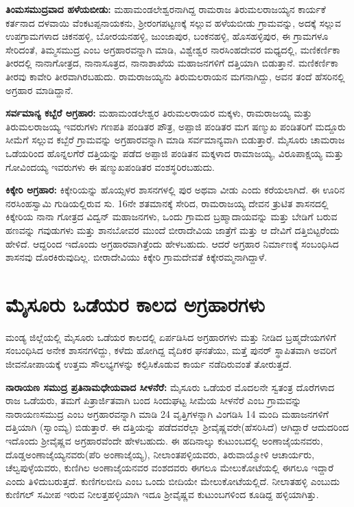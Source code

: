 \textbf{ತಿಂಮಸಮುದ್ರವಾದ ಹಳೆಯಬೀಡು: } ಮಹಾಮಂಡಲೇಶ್ವರನಾಗಿದ್ದ ರಾಮರಾಜ ತಿರುಮಲರಾಜಯ್ಯನ ಕಾರ್ಯಕೆ ಕರ್ತನಾದ ದಳವಾಯಿ ವೆಂಕಟಪ್ಪನಾಯಕನು, ಶ‍್ರೀರಂಗಪಟ್ಟಣಕ್ಕೆ ಸಲ್ಲುವ ಹಳೆಯಬೀಡು ಗ್ರಾಮವನ್ನು, ಅದಕ್ಕೆ ಸಲ್ಲುವ ಉಪಗ್ರಾಮಗಳಾದ ಚಿಕನಹಳ್ಳಿ, ಬೋರಯನಹಳ್ಳಿ, ಜುಂಜಾಪುರ, ಬಂಕನಹಳ್ಳಿ, ಹೊಸಹಳ್ಳಿಪುರ, ಈ ಗ್ರಾಮಗಳೂ ಸೇರಿದಂತೆ, ತಿಮ್ಮಸಮುದ್ರ ಎಂಬ ಅಗ್ರಹಾರವನ್ನಾಗಿ ಮಾಡಿ, ವಿಶ್ವೇಶ್ವರ ನಾರಸಿಂಹದೇವರ ಮಧ್ಯದಲ್ಲಿ, ಮಣಿಕರ್ಣಿಕಾ ತೀರದಲ್ಲಿ ನಾನಾಗೋತ್ರದ, ನಾನಾಸೂತ್ರದ, ನಾನಾಶಾಖೆಯ ಮಹಾಜನಗಳಿಗೆ ದತ್ತಿಯಾಗಿ ಬಿಡುತ್ತಾನೆ. ಮಣಿಕರ್ಣಿಕಾ ತೀರವು ಕಾವೇರಿ ತೀರವಾಗಿರಬಹುದು. ರಾಮರಾಜಯ್ಯನು ತಿರುಮಲರಾಯನ ಮಗನಾಗಿದ್ದು, ಅವನ ತಂದೆ ಹೆಸರಿನಲ್ಲಿ ಅಗ್ರಹಾರ ಮಾಡಿದ್ದಾನೆ.

\textbf{ಸರ್ವಮಾನ್ಯ ಕಬ್ಬೆರೆ ಅಗ್ರಹಾರ:} ಮಹಾಮಂಡಲೇಶ್ವರ ತಿರುಮಲರಾಯರ ಮಕ್ಕಳು, ರಾಮರಾಜಯ್ಯ ಮತ್ತು ತಿರುಮಲರಾಜಯ್ಯ ಇವರುಗಳು ಗಣಪತಿ ಪಂಡಿತರ ಪೌತ್ರ, ಅಪ್ಪಾಜಿ ಪಂಡಿತರ ಮಗ ಷಣ್ಮುಖ ಪಂಡಿತರಿಗೆ ಮದ್ದೂರು ಸೀಮೆಗೆ ಸಲ್ಲುವ ಕಬ್ಬೆರೆ ಗ್ರಾಮವನ್ನು ಅಗ್ರಹಾರವನ್ನಾಗಿ ಮಾಡಿ ಸರ್ವಮಾನ್ಯವಾಗಿ ಬಿಡುತ್ತಾರೆ. ಮೈಸೂರು ಚಾಮರಾಜ ಒಡೆಯರಿಂದ ಹೊನ್ನಲಗೆರೆ ದತ್ತಿಯನ್ನು ಪಡೆದ ಅಪ್ಪಾಜಿ ಪಂಡಿತನ ಮಕ್ಕಳಾದ ರಾಮಾಜಯ್ಯ, ವಿರೂಪಾಕ್ಷಯ್ಯ ಮತ್ತು ಗೋವಿಂದಯ್ಯ ಇವರುಗಳು ಈ ಷಣ್ಮುಖಪಂಡಿತರ ವಂಶಸ್ಥರಿರಬಹುದು.

\textbf{ಕಿಕ್ಕೇರಿ ಅಗ್ರಹಾರ:} ಕಿಕ್ಕೇರಿಯನ್ನು ಹೊಯ್ಸಳರ ಶಾಸನಗಳಲ್ಲಿ ಪುರ ಅಥವಾ ವೀಡು ಎಂದು ಕರೆಯಲಾಗಿದೆ. ಈ ಊರಿನ ನರಸಿಂಹಸ್ವಾಮಿ ಗುಡಿಯಲ್ಲಿರುವ ಸು. 16ನೇ ಶತಮಾನಕ್ಕೆ ಸೇರಿದ, ರಾಮರಾಜಯ್ಯ ದೇವನ ತ್ರುಟಿತ ಶಾಸನದಲ್ಲಿ ಕಿಕ್ಕೇರಿಯ ನಾನಾ ಗೋತ್ರದ ವಿದ್ವನ್​ ಮಹಾಜನಗಳು, ಒಂದು ಗ್ರಾಮದ ಬ್ರಹ್ಮಾದಾಯವನ್ನು ಮತ್ತು ಬೇಡಿಗೆ ಬರುವ ಹಣವನ್ನು ಗವುಡುಗಳು ಮತ್ತು ಶಾನಬೋವರ ಮುಂದೆ ಬೀರಾದೇವಿಯ ಜಾತ್ರೆಗೆ ಮತ್ತು ಆ ದೇವಿಗೆ ದತ್ತಿಬಿಟ್ಟರೆಂದು ಹೇಳಿದೆ. ಆದ್ದರಿಂದ ಇದೊಂದು ಅಗ್ರಹಾರವಾಗಿತ್ತೆಂದು ಹೇಳಬಹುದು. ಆದರೆ ಅಗ್ರಹಾರ ನಿರ್ಮಾಣಕ್ಕೆ ಸಂಬಂಧಿಸಿದ ಶಾಸನವು ದೊರಕಿರುವುದಿಲ್ಲ. ಬೀರಾದೇವಿಯು ಕಿಕ್ಕೇರಿ ಗ್ರಾಮದೇವತೆ ಕಿಕ್ಕೇರಮ್ಮನಾಗಿದ್ದಾಳೆ.


\section{ಮೈಸೂರು ಒಡೆಯರ ಕಾಲದ ಅಗ್ರಹಾರಗಳು}

ಮಂಡ್ಯ ಜಿಲ್ಲೆಯಲ್ಲಿ ಮೈಸೂರು ಒಡೆಯರ ಕಾಲದಲ್ಲಿ ಏರ್ಪಡಿಸಿದ ಅಗ್ರಹಾರಗಳು ಮತ್ತು ನೀಡಿದ ಬ್ರಹ್ಮದೇಯಗಳಿಗೆ ಸಂಬಂಧಿಸಿದ ಅನೇಕ ಶಾಸನಗಳಿದ್ದು, ಕಳೆದು ಹೋಗಿದ್ದ ವೈದಿಕರ ಘನತೆಯು, ಮತ್ತೆ ಪುನರ್​ ಸ್ಥಾಪಿತವಾಗಿ ಅವರಿಗೆ ಜೀವನೋಪಾಯಕ್ಕೆ ಉತ್ತಮ ಸೌಲಭ್ಯಗಳನ್ನು ಕಲ್ಪಿಸಿಕೊಡುವ ಕಾರ್ಯ ನಡೆದಿರುವಂತೆ ತೋರುತ್ತದೆ.

\textbf{ನಾರಾಯಣ ಸಮುದ್ರ ಪ್ರತಿನಾಮಧೇಯವಾದ ಸೀಳನೆರೆ:} ಮೈಸೂರು ಒಡೆಯರ ಮೊದಲನೇ ಸ್ವತಂತ್ರ ದೊರೆಗಳಾದ ರಾಜ ಒಡೆಯರು, ತಮಗೆ ಪಿತ್ರಾರ್ಜಿತವಾಗಿ ಬಂದ ಸಿಂದುಘಟ್ಟ ಸೀಮೆಯ ಸೀಳನೆರೆ ಎಂಬ ಗ್ರಾಮವನ್ನು ನಾರಾಯಣಸಮುದ್ರ ಎಂಬ ಅಗ್ರಹಾರವನ್ನಾಗಿ ಮಾಡಿ 24 ವೃತ್ತಿಗಳನ್ನಾಗಿ ವಿಂಗಡಿಸಿ 14 ಮಂದಿ ಮಹಾಜನಗಳಿಗೆ ದತ್ತಿಯಾಗಿ (ಸ್ವಾಂಮ್ಯ) ಬಿಡುತ್ತಾರೆ. ಈ ದತ್ತಿಯನ್ನು ಪಡೆದವರೆಲ್ಲಾ ಶ‍್ರೀವೈಷ್ಣವರೇ(ಹೆಸರಿಸಿದೆ) ಆಗಿದ್ದಾರೆ ಆದುದರಿಂದ ಇದೊಂದು ಶ‍್ರೀವೈಷ್ಣವ ಅಗ್ರಹಾರವೆಂದೇ ಹೇಳಬಹುದು. ಈ ಹದಿನಾಲ್ಕು ಕುಟುಂಬದಲ್ಲಿ ಅಂಣಾಜೈಯನವರು, ದೊಡ್ಡಅಂಣಾಜೈಯ್ಯನವರು(ಪೆರಿ ಅಂಣಾಜೈಯ್ಯ), ನೀಲಾಂತಪಳ್ಳಿಯವರು, ತಿರುವಾಯ್ಮೋಳಿ ಆಚಾರ್ಯರು, ಚೆಲ್ವಪುಳ್ಳೆಯವರು, ಕುಣಿಗಿಲ ಅಂಣಾಜೈಯನವರ ವಂಶದವರು ಈಗಲೂ ಮೇಲುಕೋಟೆಯಲ್ಲಿ ಈಗಲೂ ಇದ್ದಾರೆ ಎಂದು ತಿಳಿದುಬರುತ್ತದೆ. ಕುಣಿಗಲಬೀದಿ ಎಂಬ ಒಂದು ಬೀದಿಯೇ ಮೇಲುಕೋಟೆಯಲ್ಲಿದೆ. ನೀಲಾತಹಳ್ಳಿ ಎಂಬುದು ಕುಣಿಗಲ್​ ಸಮೀಪ ಇರುವ ನೀಲತ್ತಹಳ್ಳಿಯಾಗಿ ಇದೂ ಶ‍್ರೀವೈಷ್ಣವ ಕುಟುಂಬಗಳಿಂದ ಕೂಡಿದ್ದ ಹಳ್ಳಿಯಾಗಿತ್ತು. 

